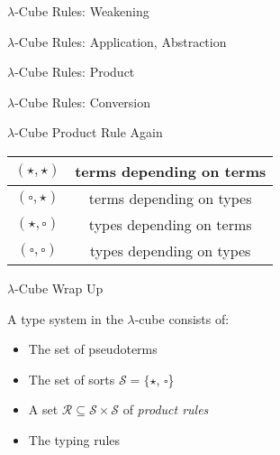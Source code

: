 \documentclass{beamer}
\begin{document}
\begin{frame}{$\lambda$-Cube Rules: Weakening}



\end{frame}


\begin{frame}{$\lambda$-Cube Rules: Application, Abstraction}



\end{frame}


\begin{frame}{$\lambda$-Cube Rules: Product}



\end{frame}


\begin{frame}{$\lambda$-Cube Rules: Conversion}



\end{frame}


\begin{frame}{$\lambda$-Cube Product Rule Again}


  \begin{center}
    \begin{tabular}{|c|c|}
    \hline
    $(\star, \star)$ & terms depending on terms \\
    \hline
    $(\square, \star)$ & terms depending on types \\
    \hline
    $(\star, \square)$ & types depending on terms \\
    \hline
    $(\square, \square)$ & types depending on types \\
    \hline
    \end{tabular}
  \end{center}

\end{frame}

\begin{frame}{$\lambda$-Cube Wrap Up}

  A type system in the $\lambda$-cube consists of:

  \begin{itemize}
    \item
      The set of pseudoterms
    \item
      The set of sorts $\mathcal{S} = \{\star$, $\square$\}
    \item
      A set $\mathcal{R} \subseteq \mathcal{S} \times \mathcal{S}$ of \emph{product rules}
    \item
      The typing rules
  \end{itemize}

\end{frame}
\end{document}

